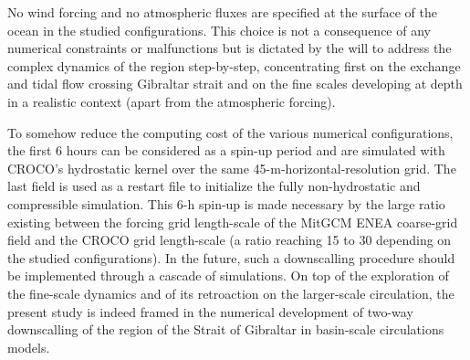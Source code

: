 No wind forcing and no atmospheric fluxes are specified at the surface of the ocean in the studied configurations. This choice is not a consequence of any numerical constraints or malfunctions but is dictated by the will to address the complex dynamics of the region step-by-step, concentrating first on the exchange and tidal flow crossing Gibraltar strait and on the fine scales developing at depth in a realistic context (apart from the atmospheric forcing).%

To somehow reduce the computing cost of the various numerical configurations, the first 6 hours can be considered as a spin-up period and are simulated with CROCO's hydrostatic kernel over the same 45-m-horizontal-resolution grid. The last field is used as a restart file to initialize the fully non-hydrostatic and compressible simulation. This 6-h spin-up is made necessary by the large ratio existing between the forcing grid length-scale of the MitGCM ENEA coarse-grid field and the CROCO grid length-scale (a ratio reaching 15 to 30 depending on the studied configurations). In the future, such a downscalling procedure should be implemented through a cascade of simulations. On top of the exploration of the fine-scale dynamics and of its retroaction on the larger-scale circulation, the present study is indeed framed in the numerical development of two-way downscalling of the region of the Strait of Gibraltar in basin-scale circulations models.


